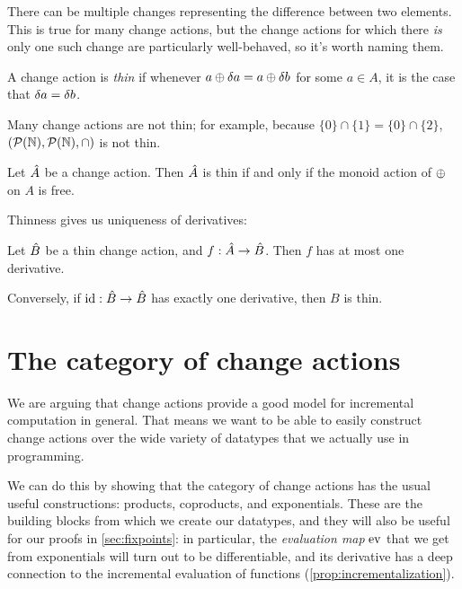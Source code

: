 There can be multiple changes representing the difference
between two elements. This is true for many change actions, but the change
actions for which there \emph{is} only one such change are particularly
well-behaved, so it's worth naming them.

\begin{defn}
  A change action is \emph{thin} if whenever $a \oplus \delta a
  = a \oplus \delta b$ for some $a \in A$, it is the case that $\delta a = \delta b$.
\end{defn}

Many change actions are not thin; for example, because $\{0\} \cap \{1\} = \{0\} \cap \{2\}$, $(\mathcal{P}(\mathbb{N}),\mathcal{P}(\mathbb{N}),\cap)$ is not thin.

\begin{prop}
  Let $\hat{A}$ be a change action. Then $\hat{A}$ is thin if and only if the monoid action of $\oplus$ on $A$ is free.
\end{prop}

Thinness gives us uniqueness of derivatives:

\begin{prop}
  Let $\hat{B}$ be a thin change action, and $f: \hat{A} \rightarrow \hat{B}$. Then $f$ has at
  most one derivative.

  Conversely, if $\textrm{id}: \hat{B} \rightarrow \hat{B}$ has exactly one derivative, then
  $B$ is thin.
\end{prop}

\section{The category of change actions}
\label{sec:category}

We are arguing that change actions provide a good model for incremental
computation in general. That means we want to be able to easily construct change
actions over the wide variety of datatypes that we actually use in programming.

We can do this by showing that the category of change actions has the usual
useful constructions: products, coproducts, and exponentials. These are the
building blocks from which we create our datatypes, and they will also be useful
for our proofs in \cref{sec:fixpoints}: in particular, the \emph{evaluation map}
$\operatorname{ev}$ that we get from exponentials will turn out to be differentiable, and its
derivative has a deep connection to the incremental evaluation of functions (\cref{prop:incrementalization}).

